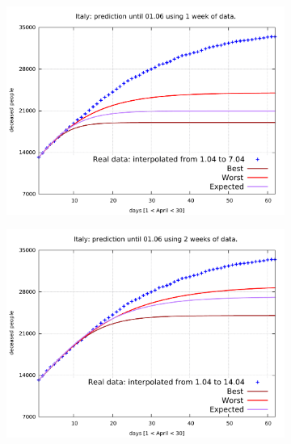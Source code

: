 \documentclass[8pt]{article}
\begin{document}
\begin{figure}[h!]
  \centering
  \begin{subfigure}[b]{0.45\linewidth}
  \includegraphics[width=\linewidth]{../err10p_simulations/it/1-7/1-7.pdf}
  \end{subfigure}
  \begin{subfigure}[b]{0.45\linewidth}
    \includegraphics[width=\linewidth]{../err10p_simulations/it/1-14/1-14.pdf}
  \end{subfigure}
  \begin{subfigure}[b]{0.45\linewidth}

\end{subfigure}
\end{figure}
\end{document}
